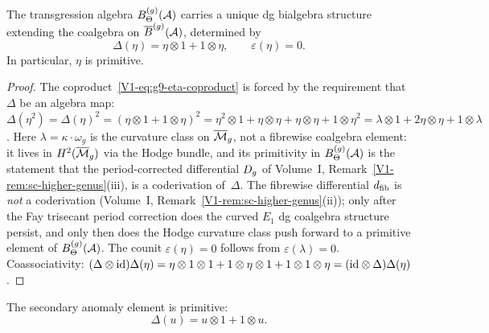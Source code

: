 \begin{proposition}
The transgression algebra $B_\Theta^{(g)}(\mathcal{A})$ carries a unique
dg bialgebra structure extending the coalgebra on
$\overline{B}^{(g)}(\mathcal{A})$, determined by
\begin{equation}%
\Delta(\eta) = \eta \otimes 1 + 1 \otimes \eta,
\qquad
\varepsilon(\eta) = 0.
\end{equation}
In particular, $\eta$ is primitive.
\end{proposition}

\begin{proof}
The coproduct~\eqref{V1-eq:g9-eta-coproduct} is forced by the
requirement that $\Delta$ be an algebra map: $\Delta(\eta^2) =
\Delta(\eta)^2 = (\eta \otimes 1 + 1 \otimes \eta)^2 =
\eta^2 \otimes 1 + \eta \otimes \eta + \eta \otimes \eta +
1 \otimes \eta^2 = \lambda \otimes 1 + 2\eta \otimes \eta +
1 \otimes \lambda$. Here $\lambda = \kappa \cdot \omega_g$ is
the curvature class on $\overline{\mathcal{M}}_g$, not a fibrewise
coalgebra element: it lives in $H^{2}(\overline{\mathcal{M}}_g)$ via
the Hodge bundle, and its primitivity in $B_\Theta^{(g)}(\mathcal{A})$
is the statement that the
period-corrected differential
$D_{g}$ of Volume~I,
Remark~\ref{V1-rem:sc-higher-genus}\textup{(iii)}, is a
coderivation of~$\Delta$. The fibrewise differential
$d_{\mathrm{fib}}$ is \emph{not} a coderivation
(Volume~I,
Remark~\ref{V1-rem:sc-higher-genus}\textup{(ii)}); only after
the Fay trisecant period correction does the curved
$E_1$ dg coalgebra structure persist, and only then does
the Hodge curvature class push forward to a primitive element
of $B_\Theta^{(g)}(\mathcal{A})$. The counit $\varepsilon(\eta) = 0$
follows from $\varepsilon(\lambda) = 0$. Coassociativity:
$(\Delta \otimes \mathrm{id})\Delta(\eta) = \eta \otimes 1 \otimes 1 +
1 \otimes \eta \otimes 1 + 1 \otimes 1 \otimes \eta =
(\mathrm{id} \otimes \Delta)\Delta(\eta)$.
\end{proof}

\begin{corollary}
The secondary anomaly element is primitive:
\begin{equation}%
\Delta(u) = u \otimes 1 + 1 \otimes u.
\end{equation}
\end{corollary}

